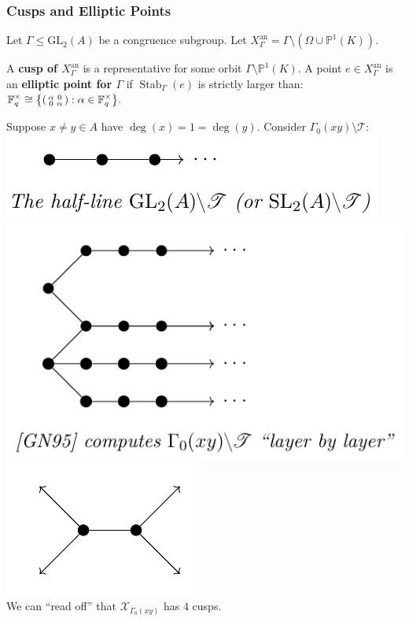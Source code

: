 \documentclass[handout]{beamer}
\numberwithin{equation}{section}
\numberwithin{case}{theorem}
\newcommand{\sT}{\mathscr{T}}		%
\newcommand{\sX}{\mathscr{X}}		%
\newcommand{\bbF}{\mathbb{F}}		%
\newcommand{\bbP}{\mathbb{P}}		%
\newcommand{\GL}{\mathrm{GL}} 	%
\newcommand{\<}{\left\langle}
\renewcommand{\>}{\right\rangle}
\begin{document}
	\begin{frame}
		\frametitle{Cusps and Elliptic Points}
		Let $\Gamma\leq \GL_2(A)$ be a congruence subgroup. Let $X_{\Gamma}^{\text{an}}=\Gamma\setminus(\Omega\cup\bbP^1(K)).$ \pause

		\begin{definition}\label{d: elliptic pt}
			A \textbf{cusp of $X_{\Gamma}^{\text{an}}$} is a representative for some orbit $\Gamma\setminus\bbP^1(K).$ \pause A point $e\in X_{\Gamma}^{\text{an}}$ is an \textbf{elliptic point for $\Gamma$} if $\operatorname{Stab}_{\Gamma}(e)$ is strictly larger than: $\displaystyle{\bbF_q^{\times}\cong\left\{\begin{psmallmatrix}\alpha&0\\0&\alpha\end{psmallmatrix}:\alpha\in \bbF_q^{\times}\right\}}.$ 
		\end{definition}
		
		\pause
		
		\begin{example}
			Suppose $x\neq y\in A$ have $\deg(x)=1=\deg(y).$ Consider $\Gamma_0(xy)\setminus\sT$:\\
			\includegraphics[scale=0.5]{halfline.png}
			\includegraphics[scale=0.5]{layers.png}
			\includegraphics[scale=0.5]{quotient.png}\\
			We can ``read off'' that $\sX_{\Gamma_0(xy)}$ has $4$ cusps.
		\end{example}
	\end{frame}	
	
\end{document}
